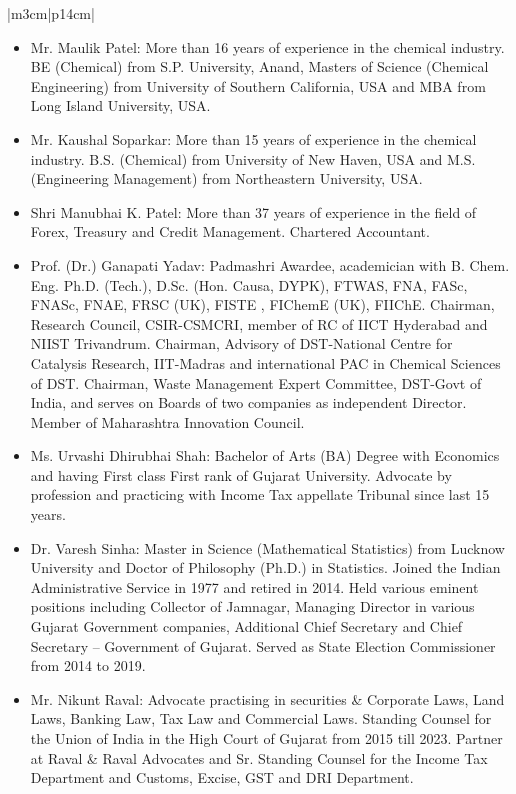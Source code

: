 \documentclass{article}
\begin{document}
\begin{longtable}{|m{3cm}|p{14cm}|}
\begin{itemize}
        \item Mr. Maulik Patel: More than 16 years of experience in the chemical industry. BE (Chemical) from S.P. University, Anand, Masters of Science (Chemical Engineering) from University of Southern California, USA and MBA from Long Island University, USA.
        
        \item Mr. Kaushal Soparkar: More than 15 years of experience in the chemical industry. B.S. (Chemical) from University of New Haven, USA and M.S. (Engineering Management) from Northeastern University, USA.
        
        \item Shri Manubhai K. Patel: More than 37 years of experience in the field of Forex, Treasury and Credit Management. Chartered Accountant.
        
        \item Prof. (Dr.) Ganapati Yadav: Padmashri Awardee, academician with B. Chem. Eng. Ph.D. (Tech.), D.Sc. (Hon. Causa, DYPK), FTWAS, FNA, FASc, FNASc, FNAE, FRSC (UK), FISTE , FIChemE (UK), FIIChE. Chairman, Research Council, CSIR-CSMCRI, member of RC of IICT Hyderabad and NIIST Trivandrum. Chairman, Advisory of DST-National Centre for Catalysis Research, IIT-Madras and international PAC in Chemical Sciences of DST. Chairman, Waste Management Expert Committee, DST-Govt of India, and serves on Boards of two companies as independent Director. Member of Maharashtra Innovation Council.
        
        \item Ms. Urvashi Dhirubhai Shah: Bachelor of Arts (BA) Degree with Economics and having First class First rank of Gujarat University. Advocate by profession and practicing with Income Tax appellate Tribunal since last 15 years.
        
        \item Dr. Varesh Sinha: Master in Science (Mathematical Statistics) from Lucknow University and Doctor of Philosophy (Ph.D.) in Statistics. Joined the Indian Administrative Service in 1977 and retired in 2014. Held various eminent positions including Collector of Jamnagar, Managing Director in various Gujarat Government companies, Additional Chief Secretary and Chief Secretary – Government of Gujarat. Served as State Election Commissioner from 2014 to 2019.
        
        \item Mr. Nikunt Raval: Advocate practising in securities & Corporate Laws, Land Laws, Banking Law, Tax Law and Commercial Laws. Standing Counsel for the Union of India in the High Court of Gujarat from 2015 till 2023. Partner at Raval & Raval Advocates and Sr. Standing Counsel for the Income Tax Department and Customs, Excise, GST and DRI Department.
        
    \end{itemize} \\
    \hline
\end{longtable}
\end{document}
